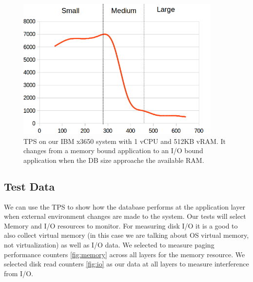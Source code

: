 \begin{figure}[!h]
  \begin{center}
  \includegraphics[width=4in]{images/SmallScale.png}
  \caption{TPS on our IBM x3650 system with 1 vCPU and 512KB vRAM. It changes from a memory bound application to an I/O bound application when the DB size approache the available RAM.}
  \label{smallIO}
  \end{center}
\end{figure}

\subsection{Test Data}
\indent We can use the TPS to show how the database performs at the application layer when external environment changes are made to the system.  Our tests will select Memory and I/O resources to monitor.  For measuring disk I/O it is a good to also collect virtual memory (in this case we are talking about OS virtual memory, not virtualization) as well as I/O data.  We selected to measure paging performance counters \ref{fig:memory} across all layers for the memory resource.  We selected disk read counters \ref{fig:io} as our data at all layers to measure interference from I/O. 

